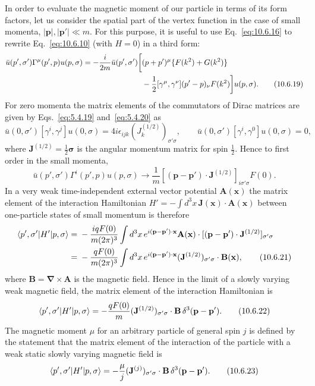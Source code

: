 In order to evaluate the magnetic moment of our particle in terms of its form
factors, let us consider the spatial part of the vertex function in the case
of small momenta, $|\mathbf{p}|,|\mathbf{p}'|\ll m$. For this purpose, it is
useful to use Eq.~\eqref{eq:10.6.16} to rewrite Eq.~\eqref{eq:10.6.10} (with
$H=0$) in a third form:
\begin{align}
  \bar u(p',\sigma')\Gamma^\mu(p',p)u(p,\sigma)
  =-\frac{i}{2m}\bar u(p',\sigma')\biggl[&
  (p+p')^\mu\{F(k^2)+G(k^2)\} \notag\\
  &-\frac12[\gamma^\mu,\gamma^\nu](p'-p)_\nu F(k^2)
  \biggr]u(p,\sigma).
  \tag{10.6.19}\label{eq:10.6.19}
\end{align}
For zero momenta the matrix elements of the commutators of Dirac matrices are
given by Eqs.~\eqref{eq:5.4.19} and~\eqref{eq:5.4.20} as
\begin{equation*}
  \bar u(0,\sigma')[\gamma^i,\gamma^j]u(0,\sigma)
  =4i\epsilon_{ijk}(J_k^{(1/2)})_{\sigma'\sigma},
  \qquad
  \bar u(0,\sigma')[\gamma^i,\gamma^0]u(0,\sigma)=0,
\end{equation*}
where $\mathbf{J}^{(1/2)}=\frac12\boldsymbol{\sigma}$ is the angular momentum
matrix for spin $\frac12$. Hence to first order in the small momenta,
\begin{equation}
  \bar u(p',\sigma')\Gamma^i(p',p)u(p,\sigma)
  \longrightarrow\frac1m
  [ (\mathbf{p}-\mathbf{p}')\cdot\mathbf{J}^{(1/2)}]_{i\sigma'\sigma}F(0).
  \tag{10.6.20}\label{eq:10.6.20}
\end{equation}
In a very weak time-independent external vector potential $\mathbf{A}(\mathbf{x})$
the matrix element of the interaction Hamiltonian
$H'=-\int d^3x\,\mathbf{J}(\mathbf{x})\cdot\mathbf{A}(\mathbf{x})$ between
one-particle states of small momentum is therefore
\begin{align}
  \langle p',\sigma'\rvert H'\lvert p,\sigma\rangle
  ={}&-\frac{iqF(0)}{m(2\pi)^3}\int d^3x\,
  e^{i(\mathbf{p}-\mathbf{p}')\cdot\mathbf{x}}
  \mathbf{A}(\mathbf{x})\cdot
  [ (\mathbf{p}-\mathbf{p}')\cdot\mathbf{J}^{(1/2)}]_{\sigma'\sigma}
  \notag\\
  ={}&-\frac{qF(0)}{m(2\pi)^3}\int d^3x\,
  e^{i(\mathbf{p}-\mathbf{p}')\cdot\mathbf{x}}
  (\mathbf{J}^{(1/2)})_{\sigma'\sigma}\cdot\mathbf{B}(\mathbf{x}),
  \tag{10.6.21}\label{eq:10.6.21}
\end{align}
where $\mathbf{B}=\boldsymbol{\nabla}\times\mathbf{A}$ is the magnetic field.
Hence in the limit of a slowly varying weak magnetic field, the matrix element
of the interaction Hamiltonian is
\begin{equation}
  \langle p',\sigma'\rvert H'\lvert p,\sigma\rangle
  =-\frac{qF(0)}m(\mathbf{J}^{(1/2)})_{\sigma'\sigma}\cdot\mathbf{B}\,
  \delta^3(\mathbf{p}-\mathbf{p}').
  \tag{10.6.22}\label{eq:10.6.22}
\end{equation}
The magnetic moment $\mu$ for an arbitrary particle of general spin $j$ is
defined by the statement that the matrix element of the interaction of the
particle with a weak static slowly varying magnetic field is
\begin{equation}
  \langle p',\sigma'\rvert H'\lvert p,\sigma\rangle
  =-\frac{\mu}{j}(\mathbf{J}^{(j)})_{\sigma'\sigma}\cdot\mathbf{B}\,
  \delta^3(\mathbf{p}-\mathbf{p}').
  \tag{10.6.23}\label{eq:10.6.23}
\end{equation}
